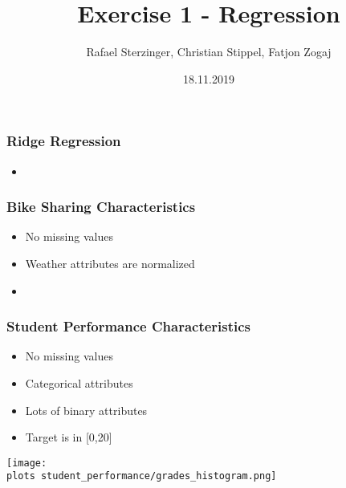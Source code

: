 \documentclass[aspectratio=169]{beamer}
\title[Your Short Title]{Exercise 1 - Regression}
\author{Rafael Sterzinger, Christian Stippel, Fatjon Zogaj}
\institute{Machine Learning}
\date{18.11.2019}
\def \plots {./plots/}
\begin{document}

\begin{frame}
  \titlepage
\end{frame}

\begin{frame}
\frametitle{Ridge Regression}
\begin{itemize}
\item 
\end{itemize}
\end{frame}

\begin{frame}{}
\frametitle{Bike Sharing Characteristics}
\begin{itemize}
\item No missing values
\item Weather attributes are normalized
\item 
\end{itemize}
\end{frame}

\begin{frame}
    \begin{figure}
        \centering
    \end{figure}
\end{frame}

\begin{frame}{}
\frametitle{Student Performance Characteristics}
\begin{minipage}{0.45\textwidth}
\begin{itemize}
\item No missing values
\item Categorical attributes
\item Lots of binary attributes
\item Target is in [0,20]
\end{itemize}
\end{minipage}
\begin{minipage}{0.5\textwidth}
    \texttt{[image: \\plots student\_performance/grades\_histogram.png]}
\end{minipage}
\end{frame}
\end{document}
